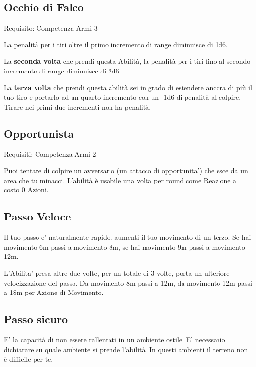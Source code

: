 \documentclass[a4paper,11pt,twoside,openany]{book}
\begin{document}
\subsection{Occhio di Falco}

Requisito: Competenza Armi 3

La penalità per i tiri oltre il primo incremento di range diminuisce di 1d6.

La \textbf{seconda volta} che prendi questa Abilità, la penalità per i tiri fino al secondo incremento di range diminuisce di 2d6.

La \textbf{terza volta} che prendi questa abilità sei in grado di estendere ancora di più il tuo tiro e portarlo ad un quarto incremento con un -1d6 di penalità al colpire. Tirare nei primi due incrementi non ha penalità.

\subsection{Opportunista}

Requisiti: Competenza Armi 2

Puoi tentare di colpire un avversario (un attacco di opportunita') che esce da un area che tu minacci. L'abilità è usabile una volta per round come Reazione a costo 0 Azioni.

\subsection{Passo Veloce}

Il tuo passo e' naturalmente rapido. aumenti il tuo movimento di un terzo.
Se hai movimento 6m passi a movimento 8m, se hai movimento 9m passi a movimento 12m.

L'Abilita' presa altre due volte, per un totale di 3 volte, porta un ulteriore velocizzazione del passo.
Da movimento 8m passi a 12m, da movimento 12m passi a 18m per Azione di Movimento.

\subsection{Passo sicuro}

E' la capacità di non essere rallentati in un ambiente ostile. E' necessario dichiarare su quale ambiente si prende l'abilità. In questi ambienti il terreno non è difficile per te.

\bigskip
\end{document}
